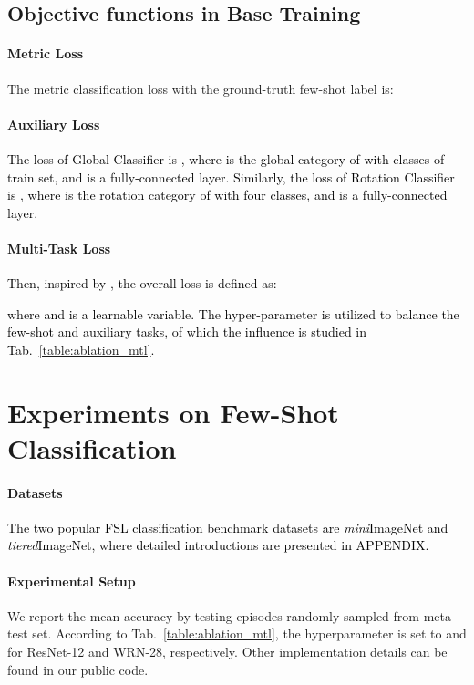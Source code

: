 \documentclass{article}
\newcommand{\ljx}[1]{\textcolor{black}{#1}}
\newcommand{\jinxiang}[1]{\textcolor{black}{#1}}
\begin{document}
\subsection{Objective functions in Base Training}
\paragraph{Metric Loss}
The metric classification loss with the ground-truth few-shot label  is:
\begin{small}

\end{small}

\paragraph{Auxiliary Loss}
\jinxiang{The loss of Global Classifier is , where  is the global category of  with  classes of train set, and  is a fully-connected layer.
Similarly, the loss of Rotation Classifier is , where  is the rotation category of  with four classes, and  is a fully-connected layer.}


\paragraph{Multi-Task Loss}
\ljx{Then, inspired by \cite{lai2022adaptive}, the overall loss is defined as:
\begin{small}

\end{small}where  and  is a learnable variable.
The hyper-parameter  is utilized to balance the few-shot and auxiliary tasks, of which the influence is studied in Tab.~\ref{table:ablation_mtl}.
}

\section{Experiments on Few-Shot Classification}
\paragraph{Datasets}
\jinxiang{The two popular FSL classification benchmark datasets are \textit{mini}ImageNet and \textit{tiered}ImageNet, where detailed introductions are presented in APPENDIX.}

\paragraph{Experimental Setup}
We report the mean accuracy by testing  episodes randomly sampled from meta-test set.
According to Tab.~\ref{table:ablation_mtl}, the hyperparameter  is set to  and  for ResNet-12 and WRN-28, respectively.
Other implementation details can be found in our public code.
\end{document}
